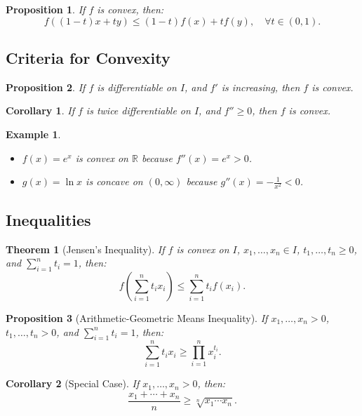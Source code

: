 \documentclass[9pt]{article}
\theoremstyle{definition}
\theoremstyle{plain}
\newtheorem{theorem}{Theorem}
\newtheorem{proposition}{Proposition}
\newtheorem{example}{Example}
\newtheorem{corollary}{Corollary}
\begin{document}
\begin{proposition}
If \( f \) is convex, then:
\[
f((1-t)x + ty) \leq (1-t)f(x) + tf(y), \quad \forall t \in (0, 1).
\]
\end{proposition}

\subsection*{Criteria for Convexity}
\begin{proposition}
If \( f \) is differentiable on \( I \), and \( f' \) is increasing, then \( f \) is convex.
\end{proposition}

\begin{corollary}
If \( f \) is twice differentiable on \( I \), and \( f'' \geq 0 \), then \( f \) is convex.
\end{corollary}

\begin{example}
\begin{itemize}
    \item \( f(x) = e^x \) is convex on \( \mathbb{R} \) because \( f''(x) = e^x > 0 \).
    \item \( g(x) = \ln x \) is concave on \( (0, \infty) \) because \( g''(x) = -\frac{1}{x^2} < 0 \).
\end{itemize}
\end{example}

\subsection*{Inequalities}
\begin{theorem}[Jensen’s Inequality]
If \( f \) is convex on \( I \), \( x_1, \ldots, x_n \in I \), \( t_1, \ldots, t_n \geq 0 \), and \( \sum_{i=1}^n t_i = 1 \), then:
\[
f\left(\sum_{i=1}^n t_i x_i\right) \leq \sum_{i=1}^n t_i f(x_i).
\]
\end{theorem}

\begin{proposition}[Arithmetic-Geometric Means Inequality]
If \( x_1, \ldots, x_n > 0 \), \( t_1, \ldots, t_n > 0 \), and \( \sum_{i=1}^n t_i = 1 \), then:
\[
\sum_{i=1}^n t_i x_i \geq \prod_{i=1}^n x_i^{t_i}.
\]
\end{proposition}

\begin{corollary}[Special Case]
If \( x_1, \ldots, x_n > 0 \), then:
\[
\frac{x_1 + \cdots + x_n}{n} \geq \sqrt[n]{x_1 \cdots x_n}.
\]
\end{corollary}
\end{document}
